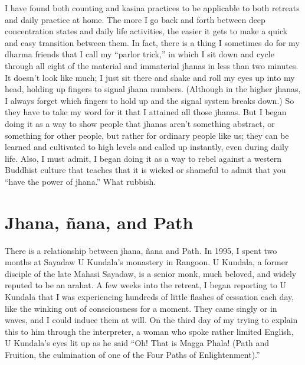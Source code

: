\documentclass[a5paper,10pt,english]{book}
\begin{document}
\sphinxAtStartPar
I have found both counting and kasina practices to be applicable to both
retreats and daily practice at home. The more I go back and forth
between deep concentration states and daily life activities, the easier
it gets to make a quick and easy transition between them. In fact, there
is a thing I sometimes do for my dharma friends that I call my “parlor
trick,” in which I sit down and cycle through all eight of the material
and immaterial jhanas in less than two minutes. It doesn’t look like
much; I just sit there and shake and roll my eyes up into my head,
holding up fingers to signal jhana numbers. (Although in the higher
jhanas, I always forget which fingers to hold up and the signal system
breaks down.) So they have to take my word for it that I attained all
those jhanas. But I began doing it as a way to show people that jhanas
aren’t something abstract, or something for other people, but rather for
ordinary people like us; they can be learned and cultivated to high
levels and called up instantly, even during daily life. Also, I must
admit, I began doing it as a way to rebel against a western Buddhist
culture that teaches that it is wicked or shameful to admit that you
“have the power of jhana.” What rubbish.


\section{Jhana, ñana, and Path}
\label{\detokenize{back-jhana-nana:jhana-nana-and-path}}
\sphinxAtStartPar
There is a relationship between jhana, ñana and Path. In 1995, I spent
two months at Sayadaw U Kundala’s monastery in Rangoon. U Kundala, a
former disciple of the late Mahasi Sayadaw, is a senior monk, much
beloved, and widely reputed to be an arahat. A few weeks into the
retreat, I began reporting to U Kundala that I was experiencing hundreds
of little flashes of cessation each day, like the winking out of
consciousness for a moment. They came singly or in waves, and I could
induce them at will. On the third day of my trying to explain this to
him through the interpreter, a woman who spoke rather limited English, U
Kundala’s eyes lit up as he said “Oh! That is Magga Phala! (Path and
Fruition, the culmination of one of the Four Paths of Enlightenment).”
\end{document}
